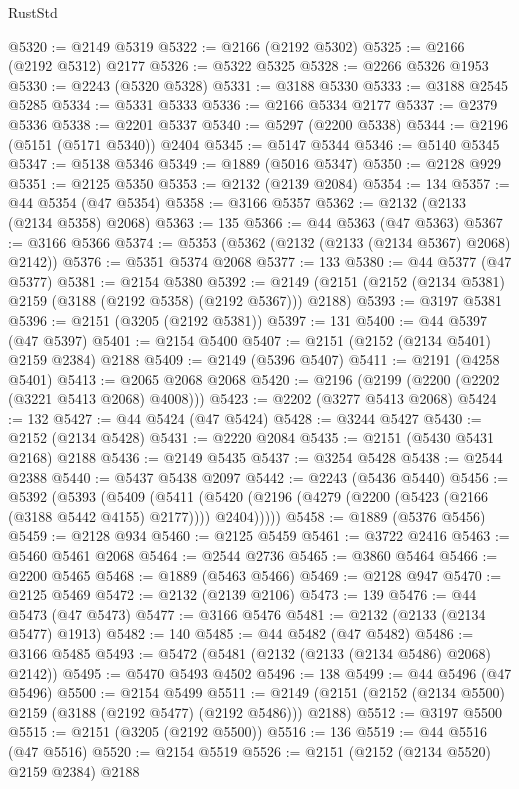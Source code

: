 \begin{lexlean}{RustStd}
\begin{coremodule}
@5320 := @2149 @5319
@5322 := @2166 (@2192 @5302)
@5325 := @2166 (@2192 @5312) @2177
@5326 := @5322 @5325
@5328 := @2266 @5326 @1953
@5330 := @2243 (@5320 @5328)
@5331 := @3188 @5330
@5333 := @3188 @2545 @5285
@5334 := @5331 @5333
@5336 := @2166 @5334 @2177
@5337 := @2379 @5336
@5338 := @2201 @5337
@5340 := @5297 (@2200 @5338)
@5344 := @2196 (@5151 (@5171 @5340)) @2404
@5345 := @5147 @5344
@5346 := @5140 @5345
@5347 := @5138 @5346
@5349 := @1889 (@5016 @5347)
@5350 := @2128 @929
@5351 := @2125 @5350
@5353 := @2132 (@2139 @2084)
@5354 := 134
@5357 := @44 @5354 (@47 @5354)
@5358 := @3166 @5357
@5362 := @2132 (@2133 (@2134 @5358) @2068)
@5363 := 135
@5366 := @44 @5363 (@47 @5363)
@5367 := @3166 @5366
@5374 := @5353 (@5362 (@2132 (@2133 (@2134 @5367) @2068) @2142))
@5376 := @5351 @5374 @2068
@5377 := 133
@5380 := @44 @5377 (@47 @5377)
@5381 := @2154 @5380
@5392 := @2149 (@2151 (@2152 (@2134 @5381) @2159 (@3188 (@2192 @5358) (@2192 @5367))) @2188)
@5393 := @3197 @5381
@5396 := @2151 (@3205 (@2192 @5381))
@5397 := 131
@5400 := @44 @5397 (@47 @5397)
@5401 := @2154 @5400
@5407 := @2151 (@2152 (@2134 @5401) @2159 @2384) @2188
@5409 := @2149 (@5396 @5407)
@5411 := @2191 (@4258 @5401)
@5413 := @2065 @2068 @2068
@5420 := @2196 (@2199 (@2200 (@2202 (@3221 @5413 @2068) @4008)))
@5423 := @2202 (@3277 @5413 @2068)
@5424 := 132
@5427 := @44 @5424 (@47 @5424)
@5428 := @3244 @5427
@5430 := @2152 (@2134 @5428)
@5431 := @2220 @2084
@5435 := @2151 (@5430 @5431 @2168) @2188
@5436 := @2149 @5435
@5437 := @3254 @5428
@5438 := @2544 @2388
@5440 := @5437 @5438 @2097
@5442 := @2243 (@5436 @5440)
@5456 := @5392
    (@5393
      (@5409
        (@5411 (@5420 (@2196 (@4279 (@2200 (@5423 (@2166 (@3188 @5442 @4155) @2177)))) @2404)))))
@5458 := @1889 (@5376 @5456)
@5459 := @2128 @934
@5460 := @2125 @5459
@5461 := @3722 @2416
@5463 := @5460 @5461 @2068
@5464 := @2544 @2736
@5465 := @3860 @5464
@5466 := @2200 @5465
@5468 := @1889 (@5463 @5466)
@5469 := @2128 @947
@5470 := @2125 @5469
@5472 := @2132 (@2139 @2106)
@5473 := 139
@5476 := @44 @5473 (@47 @5473)
@5477 := @3166 @5476
@5481 := @2132 (@2133 (@2134 @5477) @1913)
@5482 := 140
@5485 := @44 @5482 (@47 @5482)
@5486 := @3166 @5485
@5493 := @5472 (@5481 (@2132 (@2133 (@2134 @5486) @2068) @2142))
@5495 := @5470 @5493 @4502
@5496 := 138
@5499 := @44 @5496 (@47 @5496)
@5500 := @2154 @5499
@5511 := @2149 (@2151 (@2152 (@2134 @5500) @2159 (@3188 (@2192 @5477) (@2192 @5486))) @2188)
@5512 := @3197 @5500
@5515 := @2151 (@3205 (@2192 @5500))
@5516 := 136
@5519 := @44 @5516 (@47 @5516)
@5520 := @2154 @5519
@5526 := @2151 (@2152 (@2134 @5520) @2159 @2384) @2188

\end{coremodule}
\end{lexlean}
